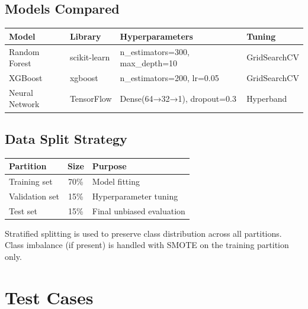 \documentclass[12pt,a4paper]{article}
\begin{document}
\subsection{Models Compared}
\begin{center}
\begin{tabular}{llll}
  \toprule
  \textbf{Model} & \textbf{Library} & \textbf{Hyperparameters} & \textbf{Tuning} \\
  \midrule
  Random Forest     & scikit-learn & n\_estimators=300, max\_depth=10 & GridSearchCV \\
  XGBoost           & xgboost      & n\_estimators=200, lr=0.05       & GridSearchCV \\
  Neural Network    & TensorFlow   & Dense(64→32→1), dropout=0.3      & Hyperband \\
  \bottomrule
\end{tabular}
\end{center}

\subsection{Data Split Strategy}
\begin{center}
\begin{tabular}{lcl}
  \toprule
  \textbf{Partition} & \textbf{Size} & \textbf{Purpose} \\
  \midrule
  Training set   & 70\% & Model fitting \\
  Validation set & 15\% & Hyperparameter tuning \\
  Test set       & 15\% & Final unbiased evaluation \\
  \bottomrule
\end{tabular}
\end{center}

\noindent Stratified splitting is used to preserve class distribution across all partitions.
Class imbalance (if present) is handled with SMOTE on the training partition only.

\section{Test Cases}
\end{document}
